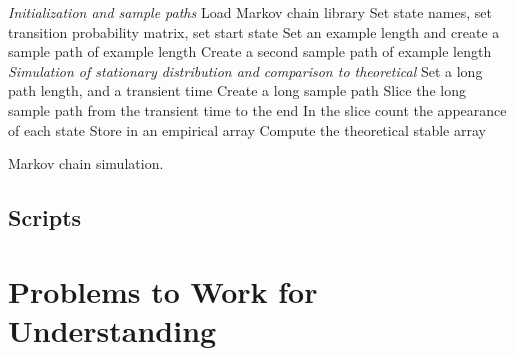 \documentclass[12pt]{article}
\begin{document}
\begin{algorithm}[H]
    \DontPrintSemicolon
    \BlankLine
    \emph{Initialization and sample paths}\;
    Load Markov chain library\;
    Set state names, set transition probability matrix, set start
    state\;
    Set an example length and create a sample path of example length\;
    Create a second sample path of example length\;
    \BlankLine
    \emph{Simulation of stationary distribution and comparison to theoretical}\;
    Set a long path length, and a transient time\;
    Create a long sample path\;
    Slice the long sample path from the transient time to the end\;
    In the slice count the appearance of each state\;
    Store in an empirical array\;
    Compute the theoretical stable array\;

    \caption{Markov chain simulation.}
\end{algorithm}

\subsection*{Scripts}



\hr

\section*{Problems to Work for Understanding}
\renewcommand{\theexerciseseries}{}
\renewcommand{\theexercise}{\arabic{exercise}}
\end{document}
